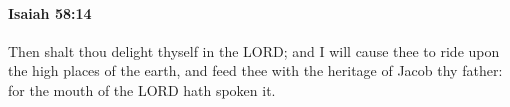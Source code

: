 
		\paragraph{Isaiah 58:14} %
			\label{ISAIAH-58-14}

			Then shalt thou delight thyself in the LORD; and I will cause thee to ride upon the high places of the earth, and feed thee with the heritage of Jacob thy father: for the mouth of the LORD hath spoken it.


